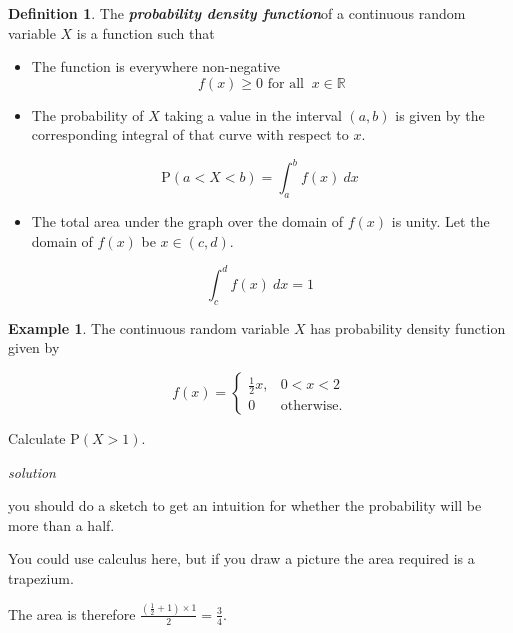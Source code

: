 \documentclass[
]{book}
\providecommand{\tightlist}{%
  \setlength{\itemsep}{0pt}\setlength{\parskip}{0pt}}
\theoremstyle{definition}
\newtheorem{definition}{Definition}[chapter]
\theoremstyle{definition}
\newtheorem{example}{Example}[chapter]
\theoremstyle{definition}
\theoremstyle{definition}
\theoremstyle{remark}
\begin{document}
\begin{definition}
The \textbf{\emph{probability density function}}of a continuous random variable \(X\) is a function such that

\begin{itemize}
\item
  The function is everywhere non-negative
  \[f(x) \geq 0 \text{ for all } \ x\in \mathbb{R}\]
\item
  The probability of \(X\) taking a value in the interval \((a,b)\) is given by the corresponding integral of that curve with respect to \(x\).
\end{itemize}

\[\text{P}(a<X<b) = \int_{a}^{b} f(x) \  dx\]

\begin{itemize}
\tightlist
\item
  The total area under the graph over the domain of \(f(x)\) is unity. Let the domain of \(f(x)\) be \(x\in (c,d)\).
\end{itemize}

\[ \int_{c}^{d} f(x) \  dx = 1\]
\end{definition}

\begin{example}
The continuous random variable \(X\) has probability density function given by

\begin{equation*}
  f(x)=\begin{cases}
    \frac{1}{2}x, &  0< x < 2\\
    0 & \text{otherwise}.
  \end{cases}
\end{equation*}

Calculate \(\text{P}(X>1)\).

\emph{solution}

you should do a sketch to get an intuition for whether the probability will be more than a half.

You could use calculus here, but if you draw a picture the area required is a trapezium.

The area is therefore \(\frac{(\frac{1}{2}+1)\times 1}{2}=\frac{3}{4}\).
\end{example}
\end{document}
